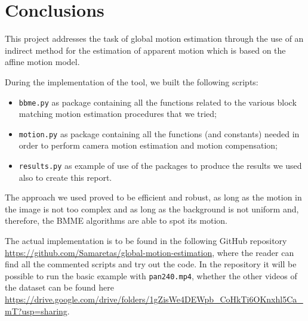 \section{Conclusions}
\label{sec:conclusions}

This project addresses the task of global motion estimation through the use of an indirect method for the estimation of apparent motion which is based on the affine motion model.

During the implementation of the tool, we built the following scripts:
\begin{itemize}[noitemsep]
    \item \texttt{bbme.py} as package containing all the functions related to the various block matching motion estimation procedures that we tried;
    \item \texttt{motion.py} as package containing all the functions (and constants) needed in order to perform camera motion estimation and motion compensation;
    \item \texttt{results.py} as example of use of the packages to produce the results we used also to create this report.  
\end{itemize}

The approach we used proved to be efficient and robust, as long as the motion in the image is not too complex and as long as the background is not uniform and, therefore, the BMME algorithms are able to spot its motion.

The actual implementation is to be found in the following GitHub repository \url{https://github.com/Samaretas/global-motion-estimation}, where the reader can find all the commented scripts and try out the code.
In the repository it will be possible to run the basic example with \texttt{pan240.mp4}, whether the other videos of the dataset can be found here \url{https://drive.google.com/drive/folders/1gZisWe4DEWpb_CoHkTi6OKnxhl5Ca_mT?usp=sharing}.